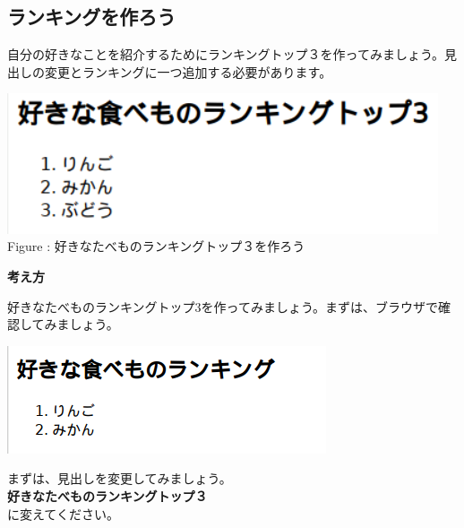 \documentclass[a4paper,12pt]{jarticle}
\begin{document}
\bigskip


\bigskip

\clearpage
{}
\subsection{\theExercise ランキングを作ろう}
自分の好きなことを紹介するためにランキングトップ３を作ってみましょう。見出しの変更とランキングに一つ追加する必要があります。



\bigskip


\begin{minipage}{12.716cm}
  {\upshape
    \includegraphics[width=12.716cm,height=4.14cm]{textbook-img178.png}
    \newline
    Figure :
    好きなたべものランキングトップ３を作ろう}
\end{minipage}


\bigskip


\bigskip

\textbf{考え方}



\bigskip



好きなたべものランキングトップ3を作ってみましょう。まずは、ブラウザで確認してみましょう。


\bigskip

\includegraphics[width=9.417cm,height=3.173cm]{textbook-img179.png}

\bigskip

まずは、見出しを変更してみましょう。\\
\textbf{好きなたべものランキングトップ３}\\
に変えてください。
\end{document}
